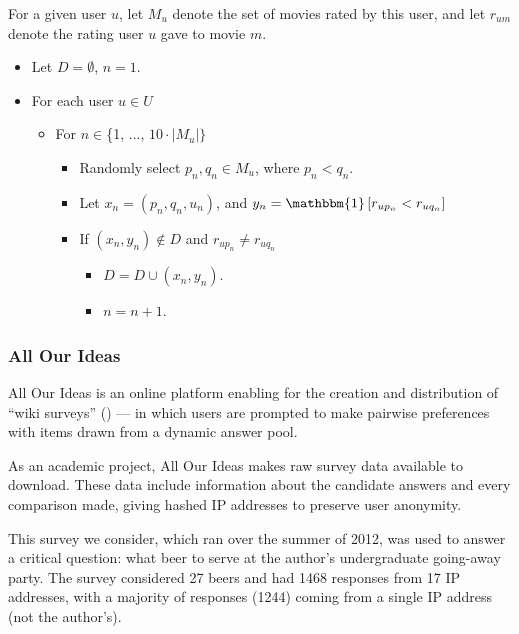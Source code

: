 For a given user $u$, let $M_u$ denote the set of movies rated by this user, and let
$r_{um}$ denote the rating user $u$ gave to movie $m$.

\begin{itemize}
	\item Let $D = \emptyset$, $n = 1$.
	\item For each user $u \in U$
	\begin{itemize}
		\item For $n \in $\{1, ..., $10\cdot|M_u|\}$
		\begin{itemize}
			\item Randomly select $p_n, q_n \in M_u$, where $p_n < q_n$.
			\item Let $x_n = (p_n, q_n, u_n)$, and $y_n = \mathbbm{1}  \left[r_{up_n} < r_{uq_n} \right]$
			\item If $(x_n,y_n) \notin D$ and $r_{up_n} \neq r_{uq_n}$
			\begin{itemize}
				\item $D = D \cup (x_n,y_n)$.
				\item $n=n+1$.
			\end{itemize}
		\end{itemize}
	\end{itemize}
\end{itemize}

\subsubsection{All Our Ideas}
All Our Ideas is an online platform enabling for the creation and distribution of ``wiki surveys'' (\cite{salganik:2015}) --- in which users are prompted to make pairwise preferences with items drawn from a dynamic answer pool.

As an academic project, All Our Ideas makes raw survey data available to download.
These data include information about the candidate answers and every comparison made, giving hashed IP addresses to preserve user anonymity.

This survey we consider, which ran over the summer of 2012, was used to answer a critical question: what beer to serve at the author's undergraduate going-away party.
The survey considered 27 beers and had 1468 responses from 17 IP addresses, with a majority of responses (1244) coming from a single IP address (not the author's).

